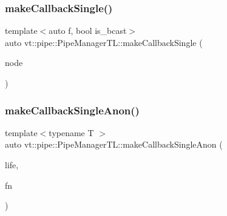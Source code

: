 \subsubsection{\texorpdfstring{make\+Callback\+Single()}{makeCallbackSingle()}\hspace{0.1cm}{\footnotesize\ttfamily [2/2]}}
{\footnotesize\ttfamily template$<$auto f, bool is\+\_\+bcast$>$ \\
auto vt\+::pipe\+::\+Pipe\+Manager\+T\+L\+::make\+Callback\+Single (\begin{DoxyParamCaption}\item[{\mbox{[}\mbox{[}maybe\+\_\+unused\mbox{]} \mbox{]} \hyperlink{namespacevt_a866da9d0efc19c0a1ce79e9e492f47e2}{Node\+Type}}]{node }\end{DoxyParamCaption})}

\mbox{\label{structvt_1_1pipe_1_1_pipe_manager_t_l_a2eac310604186b69abfd9d55a9b77c0f}} 
\subsubsection{\texorpdfstring{make\+Callback\+Single\+Anon()}{makeCallbackSingleAnon()}\hspace{0.1cm}{\footnotesize\ttfamily [1/6]}}
{\footnotesize\ttfamily template$<$typename T $>$ \\
auto vt\+::pipe\+::\+Pipe\+Manager\+T\+L\+::make\+Callback\+Single\+Anon (\begin{DoxyParamCaption}\item[{\hyperlink{namespacevt_1_1pipe_acb42b284378c0fdac1d7c6335dc26f58}{Lifetime\+Enum}}]{life,  }\item[{\hyperlink{structvt_1_1pipe_1_1_pipe_manager_base_aa54eee64ab32a27777a672d49eb861f4}{Func\+Msg\+Type}$<$ T $>$}]{fn }\end{DoxyParamCaption})}

\mbox{\label{structvt_1_1pipe_1_1_pipe_manager_t_l_a99c60d656fee4e528ff61cacc2f89392}} 
